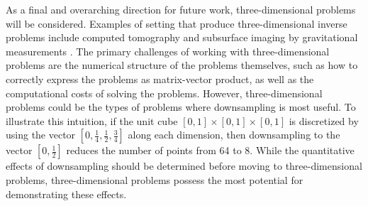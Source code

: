 As a final and overarching direction for future work, three-dimensional problems will be considered. Examples of setting that produce three-dimensional inverse problems include computed tomography and subsurface imaging by gravitational measurements \cite{ABT}. The primary challenges of working with three-dimensional problems are the numerical structure of the problems themselves, such as how to correctly express the problems as matrix-vector product, as well as the computational costs of solving the problems. However, three-dimensional problems could be the types of problems where downsampling is most useful. To illustrate this intuition, if the unit cube $[0,1] \times [0,1] \times [0,1]$ is discretized by using the vector $[0,\frac{1}{4},\frac{1}{2},\frac{3}{4}]$ along each dimension, then downsampling to the vector $[0,\frac{1}{2}]$ reduces the number of points from 64 to 8. While the quantitative effects of downsampling should be determined before moving to three-dimensional problems, three-dimensional problems possess the most potential for demonstrating these effects.
